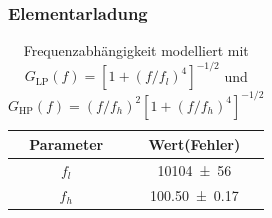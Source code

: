 \documentclass[sn-mathphys-num,iicol]{sn-jnl}
\theoremstyle{thmstyleone}
\theoremstyle{thmstyletwo}
\theoremstyle{thmstylethree}
\begin{document}
\subsubsection{Elementarladung}

\begin{table}[t]
	\centering
	\begin{tabular}{cc}
		\textbf{Parameter} & {\textbf{Wert(Fehler)}} \\
		\hline
		$f_l$              & \SI{10104 \pm 56}{}     \\
		$f_h$              & \SI{100.50 \pm 0.17}{}  \\
	\end{tabular}
	\caption{Frequenzabhängigkeit modelliert mit $G_\text{LP}(f)=\left[1+(f/f_l)^4\right]^{-1/2}$ und $G_\text{HP}(f)=(f/f_h)^2\left[1+(f/f_h)^4\right]^{-1/2}$} \label{tab:parameter}
\end{table}



\end{document}
